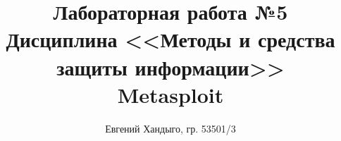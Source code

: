 \documentclass[12pt]{article}
\begin{document}
\title{
    Лабораторная работа №5 \\ 
    Дисциплина <<Методы и средства защиты информации>> \\ 
    Metasploit}
\author{Евгений Хандыго, гр. 53501/3}

\maketitle
\tableofcontents

\newpage







\end{document}
